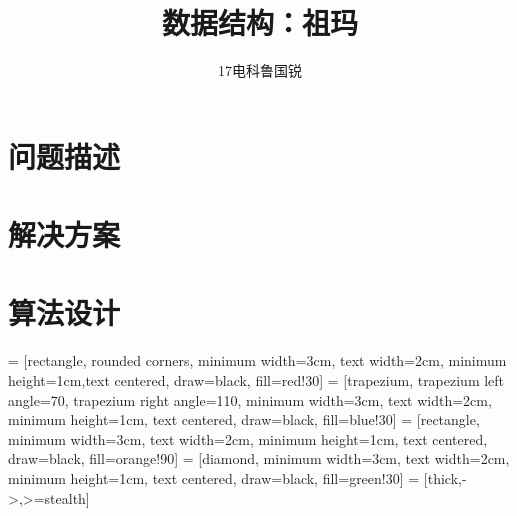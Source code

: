 \documentclass[UTF8]{ctexart}
\title{数据结构：祖玛}
\author{17电科鲁国锐}
\begin{document}
	\maketitle
	
	\section{问题描述}
	
	
	\section{解决方案}
	
	\section{算法设计}
	

\newpage
\thispagestyle{empty}
 = [rectangle, rounded corners, minimum width=3cm, text width=2cm, minimum height=1cm,text centered, draw=black, fill=red!30]
 = [trapezium, trapezium left angle=70, trapezium right angle=110, minimum width=3cm, text width=2cm, minimum height=1cm, text centered, draw=black, fill=blue!30]
 = [rectangle, minimum width=3cm, text width=2cm, minimum height=1cm, text centered, draw=black, fill=orange!90]
 = [diamond, minimum width=3cm, text width=2cm, minimum height=1cm, text centered, draw=black, fill=green!30]
 = [thick,->,>=stealth]
\end{document}
